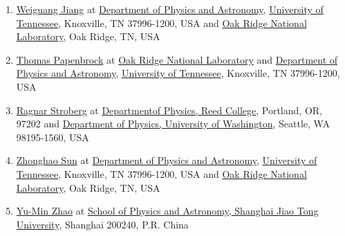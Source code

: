 \documentclass{beamer}
\begin{document}
\begin{frame}
\begin{block}{}
\begin{enumerate}
\item \href{{https://www.researchgate.net/profile/Weiguang_Jiang2}}{Weiguang Jiang} at  \href{{https://www.phys.utk.edu/}}{Department of Physics and Astronomy}, \href{{http://www.utk.edu/}}{University of Tennessee}, Knoxville, TN 37996-1200, USA and \href{{http://www.ornl.gov/}}{Oak Ridge National Laboratory}, Oak Ridge, TN, USA

\item \href{{http://web.utk.edu/~tpapenbr/default.html}}{Thomas Papenbrock}  at \href{{http://www.ornl.gov/}}{Oak Ridge National Laboratory} and \href{{https://www.phys.utk.edu/}}{Department of Physics and Astronomy}, \href{{http://www.utk.edu/}}{University of Tennessee}, Knoxville, TN 37996-1200, USA

\item \href{{http://people.reed.edu/~rstroberg/}}{Ragnar Stroberg}  at \href{{http://www.reed.edu/}}{Departmentof Physics, Reed College}, Portland, OR, 97202 and \href{{https://sharepoint.washington.edu/phys/Pages/default.aspx}}{Department of Physics, University of Washington}, Seattle, WA 98195-1560, USA

\item \href{{http://volweb.utk.edu/~zsun20/}}{Zhonghao Sun} at \href{{https://www.phys.utk.edu/}}{Department of Physics and Astronomy}, \href{{http://www.utk.edu/}}{University of Tennessee}, Knoxville, TN 37996-1200, USA and \href{{http://www.ornl.gov/}}{Oak Ridge National Laboratory}, Oak Ridge, TN, USA

\item \href{{http://www.physics.sjtu.edu.cn/en/people/1/ymZhao}}{Yu-Min Zhao}  at \href{{http://www.physics.sjtu.edu.cn/en/about/news/3}}{School of Physics and Astronomy, Shanghai Jiao Tong University}, Shanghai 200240, P.R. China 
\end{enumerate}

\noindent
\end{block}
\end{frame}
\end{document}
